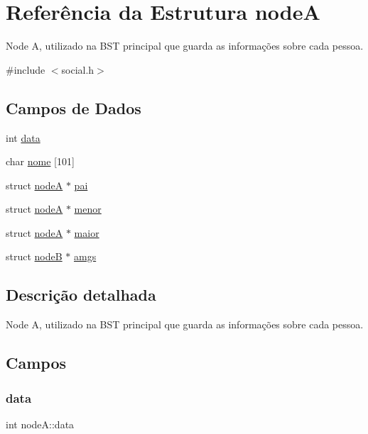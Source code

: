 \hypertarget{structnodeA}{}\section{Referência da Estrutura nodeA}
\label{structnodeA}


Node A, utilizado na B\+ST principal que guarda as informações sobre cada pessoa.  




{\ttfamily \#include $<$social.\+h$>$}

\subsection*{Campos de Dados}
\begin{DoxyCompactItemize}
\item 
int \mbox{\hyperlink{structnodeA_ad3adb17ccc0d5912b4642e49b7f2cf91}{data}}
\item 
char \mbox{\hyperlink{structnodeA_abb21dead329c9c152aaf2544337b26d7}{nome}} \mbox{[}101\mbox{]}
\item 
struct \mbox{\hyperlink{structnodeA}{nodeA}} $\ast$ \mbox{\hyperlink{structnodeA_a0ff9bb5e43589704c3ce4eb4434d76af}{pai}}
\item 
struct \mbox{\hyperlink{structnodeA}{nodeA}} $\ast$ \mbox{\hyperlink{structnodeA_a240c2a666e348701276be151d0dc6f9a}{menor}}
\item 
struct \mbox{\hyperlink{structnodeA}{nodeA}} $\ast$ \mbox{\hyperlink{structnodeA_af3a6276035abe3f5912b42d5334b84f2}{maior}}
\item 
struct \mbox{\hyperlink{structnodeB}{nodeB}} $\ast$ \mbox{\hyperlink{structnodeA_a618b5972693f9ff48d59387eced6eb09}{amgs}}
\end{DoxyCompactItemize}


\subsection{Descrição detalhada}
Node A, utilizado na B\+ST principal que guarda as informações sobre cada pessoa. 

\subsection{Campos}
\mbox{\label{structnodeA_ad3adb17ccc0d5912b4642e49b7f2cf91}} 
\subsubsection{\texorpdfstring{data}{data}}
{\footnotesize\ttfamily int node\+A\+::data}

